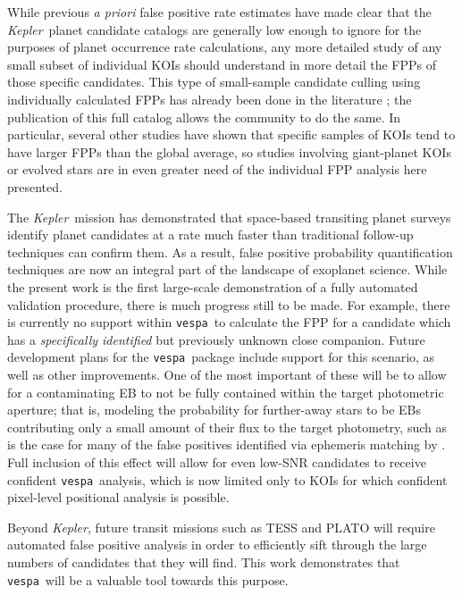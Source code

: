\documentclass{emulateapj}
\newcommand{\kepler}{\textit{Kepler}}
\newcommand{\vespa}{\texttt{vespa}}
\begin{document}
While previous \emph{a priori} false positive rate estimates
\citep{Morton:2011b,Fressin:2013} have made clear that the \kepler\
planet candidate catalogs are generally low enough to ignore for the
purposes of planet occurrence rate calculations, any more detailed
study of any small subset of individual KOIs should understand in more
detail the FPPs of those specific candidates.  This type of small-sample 
candidate culling using individually calculated FPPs has
already been done in the literature
\citep{MortonSwift:2014,MortonWinn:2014}; the publication of this full
catalog allows the community to do the same.  In particular, several
other studies have shown that specific samples of KOIs tend to have
larger FPPs than the global average, so studies involving giant-planet
KOIs \citep{Santerne:2015} or evolved stars \citep{Sliski:2014} are in
even greater need of the individual FPP analysis here presented.

The \kepler\ mission has demonstrated that space-based transiting
planet surveys identify planet candidates at a rate much faster than
traditional follow-up techniques can confirm them.  As a result, false
positive probability quantification techniques are now an integral
part of the landscape of exoplanet science.  While the present work is
the first large-scale demonstration of a fully automated validation
procedure, there is much progress still to be made.  For example,
there is currently no support within \vespa\ to calculate the FPP for
a candidate which has a \emph{specifically identified} but previously
unknown close companion.  Future development plans for the
\vespa\ package include support for this scenario, as well as other
improvements.  One of the most important of these will be to allow for
a contaminating EB to not be fully contained within the target
photometric aperture; that is, modeling the probability for
further-away stars to be EBs contributing only a small amount of their
flux to the target photometry, such as is the case for many of the
false positives identified via ephemeris matching by
\citet{Coughlin:2014}.  Full inclusion of this effect will allow for
even low-SNR candidates to receive confident \vespa\ analysis, which
is now limited only to KOIs for which confident pixel-level positional
analysis is possible.

Beyond \kepler, future transit missions such as TESS and PLATO will
require automated false positive analysis in order to efficiently sift
through the large numbers of candidates that they will find.  This
work demonstrates that \vespa\ will be a valuable tool towards this
purpose.
\end{document}
